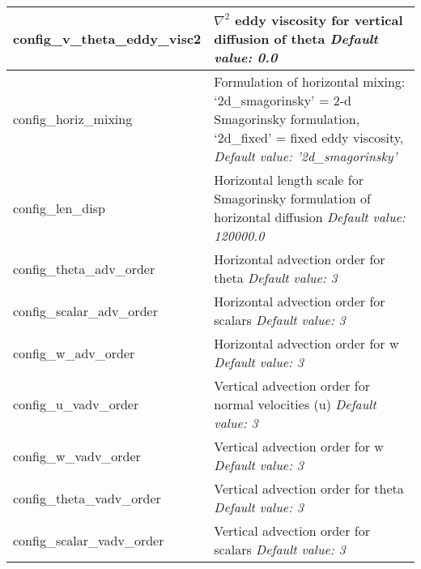 {\begin{longtable}{|p{1.75in} |p{4.5in}|}
   config\_v\_theta\_eddy\_visc2 & $\nabla^2$ eddy viscosity for vertical diffusion of theta \newline 
   {\em Default value: 0.0} \\ \hline

   config\_horiz\_mixing & Formulation of horizontal mixing: \newline
                                           `2d\_smagorinsky' = 2-d Smagorinsky formulation, \newline
                                           `2d\_fixed' = fixed eddy viscosity, \newline 
   {\em Default value: '2d\_smagorinsky'} \\ \hline

   config\_len\_disp & Horizontal length scale for Smagorinsky formulation of horizontal diffusion \newline 
   {\em Default value: 120000.0} \\ \hline

   config\_theta\_adv\_order & Horizontal advection order for theta \newline 
   {\em Default value: 3} \\ \hline

   config\_scalar\_adv\_order & Horizontal advection order for scalars \newline 
   {\em Default value: 3} \\ \hline

   config\_w\_adv\_order & Horizontal advection order for w \newline 
   {\em Default value: 3} \\ \hline

   config\_u\_vadv\_order & Vertical advection order for normal velocities (u) \newline 
   {\em Default value: 3} \\ \hline

   config\_w\_vadv\_order & Vertical advection order for w \newline 
   {\em Default value: 3} \\ \hline

   config\_theta\_vadv\_order & Vertical advection order for theta \newline 
   {\em Default value: 3} \\ \hline

   config\_scalar\_vadv\_order & Vertical advection order for scalars \newline 
   {\em Default value: 3} \\ \hline


\end{longtable}}
